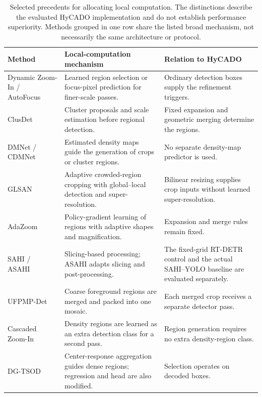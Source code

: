\documentclass[journal]{IEEEtran}
\begin{document}
\begin{table}[t]
\caption{Selected precedents for allocating local computation. The distinctions describe the evaluated HyCADO implementation and do not establish performance superiority. Methods grouped in one row share the listed broad mechanism, not necessarily the same architecture or protocol.}
\label{tab:literature}
\centering\footnotesize
\setlength{\tabcolsep}{5pt}\renewcommand{\arraystretch}{1.17}
\begin{tabular}{@{}>{\raggedright\arraybackslash}p{}>{\raggedright\arraybackslash}p{}>{\raggedright\arraybackslash}p{}@{}}
\toprule
Method & Local-computation mechanism & Relation to HyCADO\\
\midrule
Dynamic Zoom-In / AutoFocus~\cite{gao2018dynamic,najibi2019autofocus} & Learned region selection or focus-pixel prediction for finer-scale passes. & Ordinary detection boxes supply the refinement triggers.\\
ClusDet~\cite{yang2019clusdet} & Cluster proposals and scale estimation before regional detection. & Fixed expansion and geometric merging determine the regions.\\
DMNet / CDMNet~\cite{li2020dmnet,duan2021cdmnet} & Estimated density maps guide the generation of crops or cluster regions. & No separate density-map predictor is used.\\
GLSAN~\cite{deng2021glsan} & Adaptive crowded-region cropping with global--local detection and super-resolution. & Bilinear resizing supplies crop inputs without learned super-resolution.\\
AdaZoom~\cite{xujingtao2021adazoom} & Policy-gradient learning of regions with adaptive shapes and magnification. & Expansion and merge rules remain fixed.\\
SAHI / ASAHI~\cite{akyon2022sahi,zhang2023asahi} & Slicing-based processing; ASAHI adapts slicing and post-processing. & The fixed-grid RT-DETR control and the actual SAHI--YOLO baseline are evaluated separately.\\
UFPMP-Det~\cite{huang2022ufpmp} & Coarse foreground regions are merged and packed into one mosaic. & Each merged crop receives a separate detector pass.\\
Cascaded Zoom-In~\cite{meethal2023cz} & Density regions are learned as an extra detection class for a second pass. & Region generation requires no extra density-region class.\\
DG-TSOD~\cite{xie2026dgtsod} & Center-response aggregation guides dense regions; regression and head are also modified. & Selection operates on decoded boxes.\\

\end{tabular}
\end{table}
\end{document}

